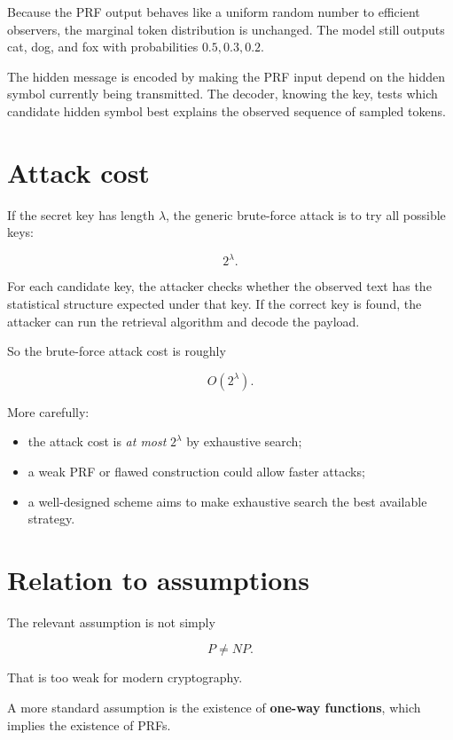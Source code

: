 \documentclass[11pt]{article}
\begin{document}
Because the PRF output behaves like a uniform random number to efficient observers, the marginal token distribution is unchanged. The model still outputs cat, dog, and fox with probabilities $0.5,0.3,0.2$.

The hidden message is encoded by making the PRF input depend on the hidden symbol currently being transmitted. The decoder, knowing the key, tests which candidate hidden symbol best explains the observed sequence of sampled tokens.

\section{Attack cost}

If the secret key has length $\lambda$, the generic brute-force attack is to try all possible keys:

\[
2^\lambda.
\]

For each candidate key, the attacker checks whether the observed text has the statistical structure expected under that key. If the correct key is found, the attacker can run the retrieval algorithm and decode the payload.

So the brute-force attack cost is roughly

\[
O(2^\lambda).
\]

More carefully:

\begin{itemize}
    \item the attack cost is \emph{at most} $2^\lambda$ by exhaustive search;
    \item a weak PRF or flawed construction could allow faster attacks;
    \item a well-designed scheme aims to make exhaustive search the best available strategy.
\end{itemize}

\section{Relation to assumptions}

\begin{callout}[warning]
\label{co:not-p-vs-np}
The relevant assumption is not simply

\[
P\ne NP.
\]

That is too weak for modern cryptography.
\end{callout}

A more standard assumption is the existence of \textbf{one-way functions}, which implies the existence of PRFs.
\end{document}
